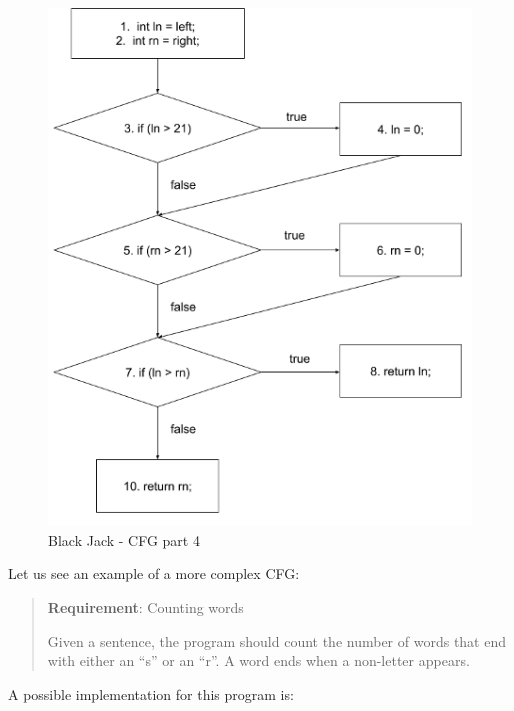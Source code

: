 \begin{figure}
\centering
\includegraphics{img/structural-testing/examples/bj-p4.png}
\caption{Black Jack - CFG part 4}
\end{figure}

Let us see an example of a more complex CFG:

\begin{quote}
\textbf{Requirement}: Counting words

Given a sentence, the program should count the number of words that end
with either an ``s'' or an ``r''. A word ends when a non-letter appears.
\end{quote}

A possible implementation for this program is:


